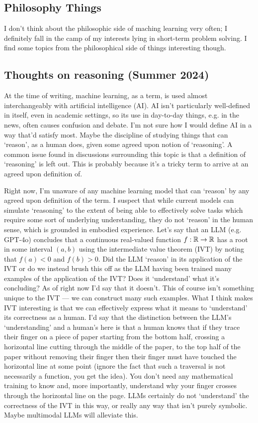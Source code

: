 \documentclass[11pt]{article}
\begin{document}
\begin{appendices}
\section{Philosophy Things}
I don't think about the philosophic side of maching learning very often; I definitely fall in the camp of my interests lying in short-term problem solving. I find some topics from the philosophical side of things interesting though.

\subsection{Thoughts on reasoning (Summer 2024)}

At the time of writing, machine learning, as a term, is used almost interchangeably with artificial intelligence (AI). AI isn't particularly well-defined in itself, even in academic settings, so its use in day-to-day things, e.g. in the news, often causes confusion and debate. I'm not sure how I would define AI in a way that'd satisfy most. Maybe the discipline of studying things that can `reason', as a human does, given some agreed upon notion of `reasoning'. A common issue found in discussions surrounding this topic is that a definition of `reasoning' is left out. This is probably because it's a tricky term to arrive at an agreed upon definition of.

Right now, I'm unaware of any machine learning model that can `reason' by any agreed upon definition of the term. I suspect that while current models can simulate `reasoning' to the extent of being able to effectively solve tasks which require some sort of underlying understanding, they do not `reason' in the human sense, which is grounded in embodied experience. Let's say that an LLM (e.g. GPT-4o) concludes that a continuous real-valued function $f:\mathbb{R}\rightarrow\mathbb{R}$ has a root in some interval $(a, b)$ using the intermediate value theorem (IVT) by noting that $f(a)<0$ and $f(b)>0$. Did the LLM `reason' in its application of the IVT or do we instead brush this off as the LLM having been trained many examples of the application of the IVT? Does it `understand' what it's concluding? As of right now I'd say that it doesn't. This of course isn't something unique to the IVT — we can construct many such examples. What I think makes IVT interesting is that we can effectively express what it means to `understand' its correctness as a human. I'd say that the distinction between the LLM's `understanding' and a human's here is that a human knows that if they trace their finger on a piece of paper starting from the bottom half, crossing a horizontal line cutting through the middle of the paper, to the top half of the paper without removing their finger then their finger must have touched the horizontal line at some point (ignore the fact that such a traversal is not necessarily a function, you get the idea). You don't need any mathematical training to know and, more importantly, understand why your finger crosses through the horizontal line on the page. LLMs certainly do not `understand' the correctness of the IVT in this way, or really any way that isn't purely symbolic. Maybe multimodal LLMs will alleviate this.


\end{appendices}
\end{document}

